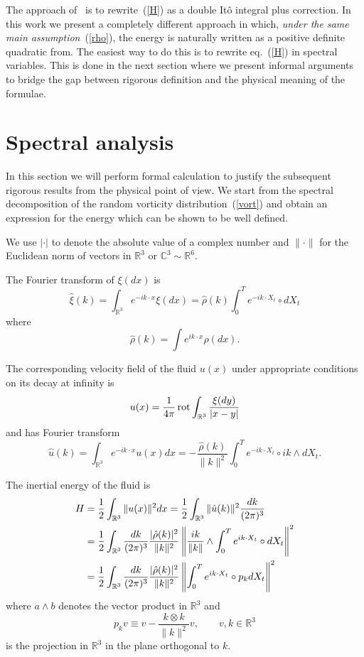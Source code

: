 The approach of~\cite{Fl2} is to rewrite~(\ref{H}) as a double It\^{o}
integral plus correction. In this work we present a completely different
approach in which, \emph{under the same main assumption}~(\ref{rho}), 
the energy is naturally written as a positive definite quadratic from. 
The easiest way to do this is to rewrite eq.~(\ref{H}) in spectral variables.
This is done in the next section where we present informal arguments to
bridge the gap between rigorous definition and the physical meaning
of the formulae.


\section{Spectral analysis}  
In this section we will perform formal calculation to justify the
subsequent rigorous results from the physical point of view. 
We start from the spectral decomposition of the random vorticity
distribution~(\ref{vort}) and obtain an expression for the energy
which can be shown to be well defined.

We use $| \cdot | $  to denote the absolute value of a complex number
and $\| \cdot \|$ for the Euclidean norm of vectors in $\mathbb{R}^3$ or
$\mathbb{C}^3 \sim \mathbb{R}^6$.

The Fourier transform of $\xi(dx)$ is
$$
\hat{\xi}(k) = \int_{\mathbb{R}^3} e^{-i k\cdot x} \xi(dx) =
\hat{\rho}(k) \int_0^T e^{-ik\cdot X_t} \circ dX_t
$$
where
$$
\hat{\rho}(k) = \int e^{ik\cdot x} \rho(dx).
$$

The corresponding velocity field of the fluid $u(x)$ under
appropriate conditions on its decay at infinity is
$$
u(x) = \frac{1}{4 \pi} \operatorname{rot} \int_{\mathbb{R}^3} \frac{\xi(dy)}{|x-y|}
$$
and has Fourier transform
$$
\hat{u}(k) = \int_{\mathbb{R}^3} e^{-i k\cdot x} u(x) dx = -
\frac{\hat{\rho}(k)}{\|k\|^2} \int_0^T e^{-ik\cdot X_t} \circ ik \wedge dX_t.
$$ 

The inertial energy of the fluid is  
\begin{equation}
\begin{split}
H & = \frac{1}{2} \int_{\mathbb{R}^3} \|u(x)\|^2 dx = \frac{1}{2} \int_{\mathbb{R}^3} 
\|\hat{u}(k)\|^2 \frac{dk}{(2\pi)^3} 
\\ & =   \frac{1}{2} \int_{\mathbb{R}^3} \frac{dk}{(2\pi)^3} \frac{|\hat{\rho}(k)|^2}{\|k\|^2} 
\left\| \frac{ik}{\|k\|} \wedge \int_0^T e^{ik\cdot X_t} \circ dX_t
\right\|^2
\\ & =   \frac{1}{2} \int_{\mathbb{R}^3} \frac{dk}{(2\pi)^3} \frac{|\hat{\rho}(k)|^2}{\|k\|^2} 
\left\| \int_0^T e^{ik\cdot X_t} \circ p_k  dX_t
\right\|^2
\end{split}
\label{eq:inertial_energy}
\end{equation}
where $a \wedge b$ denotes the vector product in $\mathbb{R}^3$ and 
$$
p_k v \equiv v - \frac{k \otimes k}{\|k\|^2} v, \qquad v,k \in \mathbb{R}^3
$$
is the projection in $\mathbb{R}^3$ in the plane orthogonal to $k$. 


